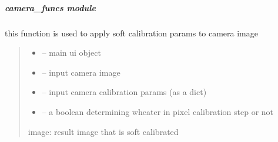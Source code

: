\documentclass[letterpaper,10pt,english]{sphinxmanual}
\begin{document}
\sphinxstepscope


\subparagraph{camera\_funcs module}
\label{\detokenize{setting/backend/camera_funcs:module-oxin.backend.camera_funcs}}\label{\detokenize{setting/backend/camera_funcs:camera-funcs-module}}\label{\detokenize{setting/backend/camera_funcs::doc}}

\begin{savenotes}\begin{fulllineitems}
\label{\detokenize{setting/backend/camera_funcs:oxin.backend.camera_funcs.apply_soft_calibrate_on_image}}
\pysigstartsignatures
{}
\pysigstopsignatures
\sphinxAtStartPar
this function is used to apply soft calibration params to camera image
\begin{quote}\begin{description}
\begin{itemize}
\item {} 
\sphinxAtStartPar
{} – main ui object

\item {} 
\sphinxAtStartPar
{} – input camera image

\item {} 
\sphinxAtStartPar
{} – input camera calibration params (as a dict)

\item {} 
\sphinxAtStartPar
{} – a boolean determining wheater in pixel calibration step or not

\end{itemize}

\sphinxAtStartPar
image: result image that is soft calibrated

\end{description}\end{quote}

\end{fulllineitems}\end{savenotes}
\end{document}
